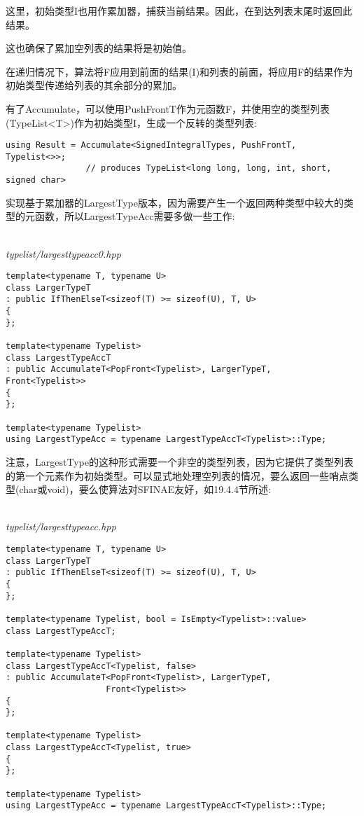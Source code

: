 这里，初始类型I也用作累加器，捕获当前结果。因此，在到达列表末尾时返回此结果。

\begin{tcolorbox}[colback=webgreen!5!white,colframe=webgreen!75!black]
\hspace*{0.75cm}这也确保了累加空列表的结果将是初始值。
\end{tcolorbox}

在递归情况下，算法将F应用到前面的结果(I)和列表的前面，将应用F的结果作为初始类型传递给列表的其余部分的累加。

有了Accumulate，可以使用PushFrontT作为元函数F，并使用空的类型列表(TypeList<T>)作为初始类型I，生成一个反转的类型列表:

\begin{lstlisting}[style=styleCXX]
using Result = Accumulate<SignedIntegralTypes, PushFrontT, Typelist<>>;
				// produces TypeList<long long, long, int, short, signed char>
\end{lstlisting}

实现基于累加器的LargestType版本，因为需要产生一个返回两种类型中较大的类型的元函数，所以LargestTypeAcc需要多做一些工作:

\hspace*{\fill} \\ %
\noindent
\textit{typelist/largesttypeacc0.hpp}
\begin{lstlisting}[style=styleCXX]
template<typename T, typename U>
class LargerTypeT
: public IfThenElseT<sizeof(T) >= sizeof(U), T, U>
{
};

template<typename Typelist>
class LargestTypeAccT
: public AccumulateT<PopFront<Typelist>, LargerTypeT,
Front<Typelist>>
{
};

template<typename Typelist>
using LargestTypeAcc = typename LargestTypeAccT<Typelist>::Type;
\end{lstlisting}

注意，LargestType的这种形式需要一个非空的类型列表，因为它提供了类型列表的第一个元素作为初始类型。可以显式地处理空列表的情况，要么返回一些哨点类型(char或void)，要么使算法对SFINAE友好，如19.4.4节所述:

\hspace*{\fill} \\ %
\noindent
\textit{typelist/largesttypeacc.hpp}
\begin{lstlisting}[style=styleCXX]
template<typename T, typename U>
class LargerTypeT
: public IfThenElseT<sizeof(T) >= sizeof(U), T, U>
{
};

template<typename Typelist, bool = IsEmpty<Typelist>::value>
class LargestTypeAccT;

template<typename Typelist>
class LargestTypeAccT<Typelist, false>
: public AccumulateT<PopFront<Typelist>, LargerTypeT,
					Front<Typelist>>
{
};

template<typename Typelist>
class LargestTypeAccT<Typelist, true>
{
};

template<typename Typelist>
using LargestTypeAcc = typename LargestTypeAccT<Typelist>::Type;
\end{lstlisting}

